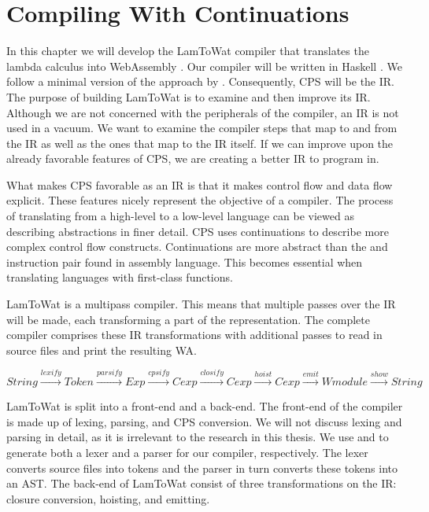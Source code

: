 
\chapter{\label{chap:cpscomp}Compiling With Continuations}
In this chapter we will develop the LamToWat compiler that translates the lambda calculus into WebAssembly \autocite{webassemblyhomepage}. Our compiler will be written in Haskell \autocite{haskellhomepage}. We follow a minimal version of the approach by \citeauthor{DBLP:books/daglib/0022396}. Consequently, \ac{CPS} will be the \ac{IR}. The purpose of building LamToWat is to examine and then improve its \ac{IR}. Although we are not concerned with the peripherals of the compiler, an \ac{IR} is not used in a vacuum. We want to examine the compiler steps that map to and from the \ac{IR} as well as the ones that map to the \ac{IR} itself. If we can improve upon the already favorable features of \ac{CPS}, we are creating a better IR to program in.

What makes \ac{CPS} favorable as an \ac{IR} is that it makes control flow and data flow explicit. These features nicely represent the objective of a compiler. The process of translating from a high-level to a low-level language can be viewed as describing abstractions in finer detail. \ac{CPS} uses continuations to describe more complex control flow constructs. Continuations are more abstract than the  and  instruction pair found in assembly language. This becomes essential when translating languages with first-class functions.

LamToWat is a multipass compiler. This means that multiple passes over the \ac{IR} will be made, each transforming a part of the representation. The complete compiler comprises these \ac{IR} transformations with additional passes to read in source files and print the resulting \ac{WA}.

\begin{equation*}
  String \xrightarrow{lexify} Token \xrightarrow{parsify} Exp \xrightarrow{cpsify} Cexp \xrightarrow{closify} Cexp \xrightarrow{hoist} Cexp \xrightarrow{emit} Wmodule \xrightarrow{show} String
\end{equation*}

LamToWat is split into a front-end and a back-end. The front-end of the compiler is made up of lexing, parsing, and \ac{CPS} conversion. We will not discuss lexing and parsing in detail, as it is irrelevant to the research in this thesis. We use \autocite{haskellalex} and \autocite{haskellhappy} to generate both a lexer and a parser for our compiler, respectively. The lexer converts source files into tokens and the parser in turn converts these tokens into an \ac{AST}. The back-end of LamToWat consist of three transformations on the \ac{IR}: closure conversion, hoisting, and emitting.

